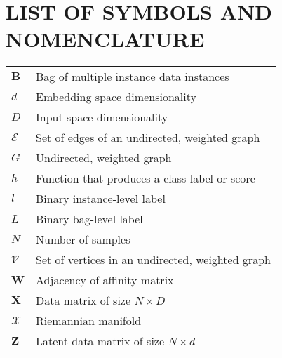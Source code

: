 

\chapter*{LIST OF SYMBOLS AND NOMENCLATURE}  %
\singlespacing
\begin{longtable}{l p{5in}} %

$\bm{B}$ & Bag of  multiple instance data instances \\
$d$ & Embedding space dimensionality\\
$D$ & Input space dimensionality\\
$\mathcal{E}$ & Set of edges of an undirected, weighted graph\\
$G$ & Undirected, weighted graph\\ 
$h$ & Function that produces a class label or score\\
$l$ & Binary instance-level label\\
$L$ & Binary bag-level label \\
$N$ & Number of samples\\
$\mathcal{V}$ & Set of vertices in an undirected, weighted graph\\ 
$\bm{W}$ & Adjacency of affinity matrix\\
$\bm{X}$ & Data matrix of size $N \times D$\\
$\mathcal{X}$ & Riemannian manifold\\
$\bm{Z}$ & Latent data matrix of size $N \times d$\\

\end{longtable}


\doublespacing

